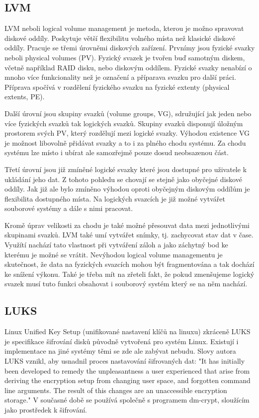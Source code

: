 \documentclass[color,table,oneside,nolot,nolof]{fithesis}
\begin{document}
\subsection{LVM}
  LVM neboli logical volume management je metoda, kterou je možno spravovat diskové oddíly. Poskytuje větší flexibilitu volného místa než klasické diskové oddíly. Pracuje se třemi
	úrovněmi
	diskových zařízení. Prvnímy jsou fyzické svazky neboli physical volumes (PV). Fyzický svazek je tvořen buď samotným diskem, včetně například RAID disku, nebo diskovým oddílem. 
	Fyzické
	svazky nenabízí o mnoho více funkcionality než je označení a příparava svazku pro další práci. Příprava spočívá v rozdělení fyzického svazku na fyzické extenty (physical extents, PE).

	Další úrovní jsou skupiny svazků (volume groups, VG), sdružující jak jeden nebo více fyzických svazků tak logických svazků. Skupiny svazků disponují úložným prostorem svých PV, 
	který rozdělují mezi logické svazky. Výhodou existence VG je možnost libovolně přidávat svazky a to i za plného chodu systému. Za chodu systému lze místo i ubírat ale samozřejmě
	pouze dosud neobsazenou část. 

	Třetí úrovní jsou již zmíněné logické svazky které jsou dostupné pro uživatele k ukládání jeho dat. Z tohoto pohledu se chovají se stejně jako obyčejné diskové oddíly. Jak již ale
	bylo zmíněno výhodou oproti obyčejným diskovým oddílům je flexibilita dostupného místa. Na logických svazcích je již možné vytvářet souborové systémy a dále s nimi pracovat.

	Kromě úprav velikosti za chodu je také možné přesouvat data mezi jednotlivými skupinami svazků. LVM také umí vytvářet snímky, tj. zachycovat stav dat v čase. Využítí nachází tato 
	vlastnost
	při vytváření záloh a jako záchytný bod ke kterému je možné se vrátit. Nevýhodou logical volume managementu je skutečnost, že data na fyzických svazcích mohou být fragmentována a tak
	dochází ke snížení výkonu. Také je třeba mít na zřeteli fakt, že pokud zmenšujeme logický svazek musí tuto funkci obsahovat i souborový systém který se na něm nachází.

\subsection{LUKS}
	Linux Unified Key Setup (unifikované nastavení klíčů na linuxu) zkráceně LUKS je specifikace šifrování disků původně vytvořená pro systém Linux. Existují i implementace na jiné 
	systémy
	těmi se zde ale zabývat nebudu. Slovy autora LUKS vznikl, aby usnadnil proces nastavování šifrovaných dat: "It has initially been developed to remedy the unpleasantness a user 
	experienced that arise from deriving the encryption setup from changing user space, and forgotten command line arguments. The result of this changes are an unaccessible encryption
	storage."\cite{on-disk-format} V současné době se používá společně s programem dm-crypt, sloužícím jako prostředek k šifrování.
\end{document}
